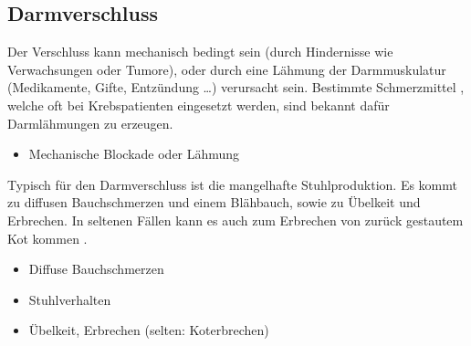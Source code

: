 % 
% 


\subsection{Darmverschluss}
%
\label{topic:ileus}%


{%
Der Verschluss kann mechanisch bedingt sein (durch
Hindernisse wie Verwachsungen oder Tumore), oder durch eine
Lähmung der Darmmuskulatur (Medikamente, Gifte, Entzündung
\ldots) verursacht sein. Bestimmte Schmerzmittel
, welche oft bei Krebspatienten eingesetzt
werden, sind bekannt dafür Darmlähmungen zu erzeugen. 
}{%
\begin{itemize}
  \item Mechanische Blockade oder Lähmung
\end{itemize}
}{}{}{}


{%
Typisch für den Darmverschluss ist die mangelhafte
Stuhlproduktion. Es kommt zu diffusen Bauchschmerzen und einem
Blähbauch, sowie zu Übelkeit und Erbrechen. In seltenen
Fällen kann es auch zum Erbrechen von zurück
gestautem Kot kommen .

\bigskip

}{
\begin{itemize}
  \item Diffuse Bauchschmerzen
  \item Stuhlverhalten
  \item Übelkeit, Erbrechen (selten: Koterbrechen)
\end{itemize}
}{}{}{}


